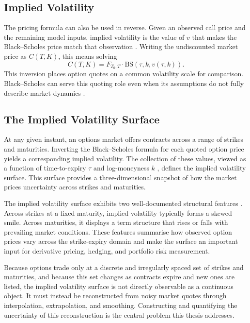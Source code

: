 \subsection{Implied Volatility}
\label{subsec:iv}

The pricing formula can also be used in reverse. Given an observed call price and the remaining model inputs, implied volatility is the value of $v$ that makes the Black--Scholes price match that observation \cite{gonon2024operator}. Writing the undiscounted market price as $C(T,K)$, this means solving
\begin{equation}
    C(T, K) = F_{T_0, T} \cdot \text{BS}(\tau, k, v(\tau, k)).
\end{equation}
This inversion places option quotes on a common volatility scale for comparison. Black--Scholes can serve this quoting role even when its assumptions do not fully describe market dynamics \cite{gonon2024operator}.

\subsection{The Implied Volatility Surface}
\label{subsec:iv_surface}

At any given instant, an options market offers contracts across a range of strikes and maturities. Inverting the Black--Scholes formula \cite{blackscholes1973} for each quoted option price yields a corresponding implied volatility. The collection of these values, viewed as a function of time-to-expiry $\tau$ and log-moneyness $k$ \cite{gatheral2014ssvi}, defines the implied volatility surface. This surface provides a three-dimensional snapshot of how the market prices uncertainty across strikes and maturities.

The implied volatility surface exhibits two well-documented structural features \cite{gatheral2014ssvi}. Across strikes at a fixed maturity, implied volatility typically forms a skewed smile. Across maturities, it displays a term structure that rises or falls with prevailing market conditions. These features summarise how observed option prices vary across the strike-expiry domain and make the surface an important input for derivative pricing, hedging, and portfolio risk measurement.

Because options trade only at a discrete and irregularly spaced set of strikes and maturities, and because this set changes as contracts expire and new ones are listed, the implied volatility surface is not directly observable as a continuous object. It must instead be reconstructed from noisy market quotes through interpolation, extrapolation, and smoothing. Constructing and quantifying the uncertainty of this reconstruction is the central problem this thesis addresses.

